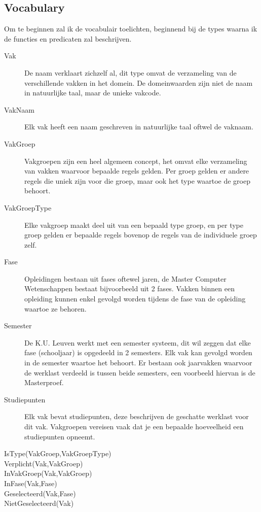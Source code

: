 \subsection{Vocabulary}
Om te beginnen zal ik de vocabulair toelichten, beginnend bij de types waarna ik de functies en predicaten zal beschrijven.
\begin{description}
\item [Vak] De naam verklaart zichzelf al, dit type omvat de verzameling van de verschillende vakken in het domein. 
De domeinwaarden zijn niet de naam in natuurlijke taal, maar de unieke vakcode.
\item [VakNaam] Elk vak heeft een naam geschreven in natuurlijke taal oftwel de vaknaam.
\item [VakGroep] Vakgroepen zijn een heel algemeen concept, het omvat elke verzameling van vakken waarvoor bepaalde regels gelden. Per groep gelden er andere regels die uniek zijn voor die groep, maar ook het type waartoe de groep behoort.
\item [VakGroepType] Elke vakgroep maakt deel uit van een bepaald type groep, en per type groep gelden er bepaalde regels bovenop de regels van de individuele groep zelf.
\item [Fase] Opleidingen bestaan uit fases oftewel jaren, de Master Computer Wetenschappen bestaat bijvoorbeeld uit 2 fases. Vakken binnen een opleiding kunnen enkel gevolgd worden tijdens de fase van de opleiding waartoe ze behoren. 
\item [Semester] De K.U. Leuven werkt met een semester systeem, dit wil zeggen dat elke fase (schooljaar) is opgedeeld in 2 semesters. Elk vak kan gevolgd worden in de semester waartoe het behoort. Er bestaan ook jaarvakken waarvoor de werklast verdeeld is tussen beide semesters, een voorbeeld hiervan is de Masterproef.
\item [Studiepunten] Elk vak bevat studiepunten, deze beschrijven de geschatte werklast voor dit vak. Vakgroepen vereisen vaak dat je een bepaalde hoeveelheid een studiepunten opneemt. 
\end{description}

\begin{description}
\item [IsType(VakGroep,VakGroepType)]
\item [Verplicht(Vak,VakGroep)]
\item [InVakGroep(Vak,VakGroep)]
\item [InFase(Vak,Fase)]
\item [Geselecteerd(Vak,Fase)]
\item [NietGeselecteerd(Vak)]
\end{description}

